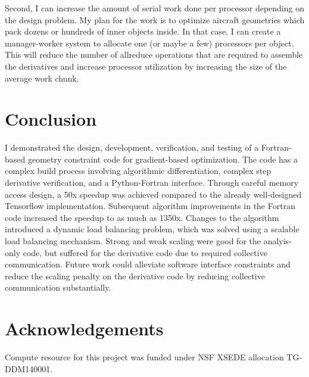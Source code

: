 \documentclass[11pt,letterpaper]{article}
\begin{document}
\qquad Second, I can increase the amount of serial work done per processor depending on the design problem.
My plan for the work is to optimize aircraft geometries which pack dozens or hundreds of inner objects inside.
In that case, I can create a manager-worker system to allocate one (or maybe a few) processors per object.
This will reduce the number of allreduce operations that are required to assemble the derivatives and increase processor utilization by increasing the size of the average work chunk.

\section{Conclusion}
\qquad I demonstrated the design, development, verification, and testing of a Fortran-based geometry constraint code for gradient-based optimization.
The code has a complex build process involving algorithmic differentiation, complex step derivative verification, and a Python-Fortran interface.
Through careful memory access design, a 50x speedup was achieved compared to the already well-designed Tensorflow implementation.
Subsequent algorithm improvements in the Fortran code increased the speedup to as much as 1350x.
Changes to the algorithm introduced a dynamic load balancing problem, which was solved using a scalable load balancing mechanism.
Strong and weak scaling were good for the analyis-only code, but suffered for the derivative code due to required collective communication.
Future work could alleviate software interface constraints and reduce the scaling penalty on the derivative code by reducing collective communication substantially.

\section{Acknowledgements}
Compute resource for this project was funded under NSF XSEDE allocation TG-DDM140001.
\end{document}
